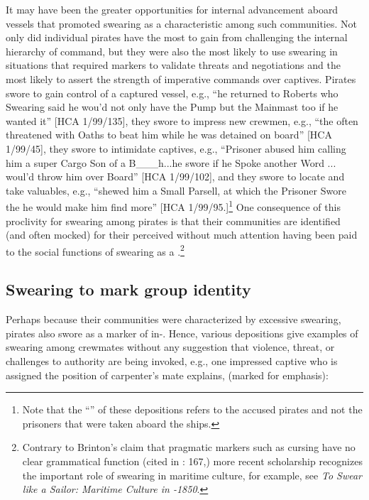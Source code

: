 It may have been the greater opportunities for internal advancement aboard  vessels that promoted swearing as a characteristic  among such communities. Not only did individual pirates have the most to gain from challenging the internal hierarchy of command, but they were also the most likely to use swearing in situations that required  markers to validate threats and negotiations and the most likely to assert the strength of imperative commands over captives. Pirates swore to gain control of a captured vessel, e.g., “he returned to Roberts who Swearing said he wou’d not only have the Pump but the Mainmast too if he wanted it” [HCA 1/99/135], they swore to impress new crewmen, e.g., “the  often threatened with Oaths to beat him while he was detained on board” [HCA 1/99/45], they swore to intimidate captives, e.g., “Prisoner abused him calling him a super Cargo Son of a B\_\_\_h...he swore if he Spoke another Word ... woul’d throw him over Board” [HCA 1/99/102], and they swore to locate and take valuables, e.g., “shewed him a Small Parsell, at which the Prisoner Swore the he would make him find more” [HCA 1/99/95.]\footnote{Note that the “” of these depositions refers to the accused pirates and not the prisoners that were taken aboard the  ships.}  One consequence of this proclivity for swearing among pirates is that their communities are identified (and often mocked) for their perceived  without much attention having been paid to the social functions of swearing as a .\footnote{Contrary to Brinton’s claim that pragmatic markers such as cursing have no clear grammatical function (cited in \citealt{ClaridgeArnovick2010}: 167,) more recent scholarship recognizes the important role of swearing in maritime culture, for example, see  \textit{To Swear like a Sailor: Maritime Culture in \citealt{America1750}-1850}.} 

\subsection{{Swearing to mark group identity}}%

Perhaps because their communities were characterized by excessive swearing, pirates also swore as a marker of in-. Hence, various depositions give examples of swearing among crewmates without any suggestion that violence, threat, or challenges to authority are being invoked, e.g., one impressed captive who is assigned the position of carpenter’s mate explains, (marked for emphasis): 


